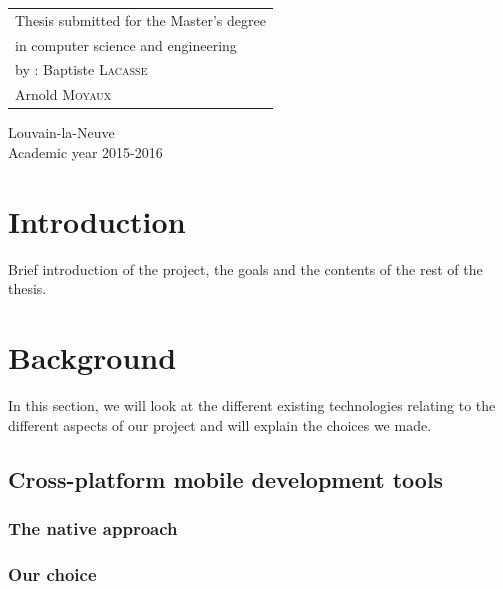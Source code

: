 \documentclass[11pt, a4paper]{report}
\newcommand\nametwo{Arnold \textsc{Moyaux}}
\newcommand\nameone{Baptiste \textsc{Lacasse}}
\newcommand\years{2015-2016}
\begin{document}
\begin{minipage}{.5\textwidth}
\begin{tabular}{l}
Thesis submitted for the Master's degree
\\ in computer science and engineering
\\ by : \nameone
\\ 	   \nametwo
\end{tabular}
\end{minipage}
\vfill
\begin{center}
Louvain-la-Neuve
\\ Academic year \years
\end{center}

\tableofcontents %
\newpage %


\chapter{Introduction} %

Brief introduction of the project, the goals and the contents of the rest of the thesis.


\chapter{Background}

In this section, we will look at the different existing technologies relating to the different aspects of our project and will explain the choices we made. 

\section{Cross-platform mobile development tools}

\subsection{The native approach}

\subsection{Our choice}
\end{document}
